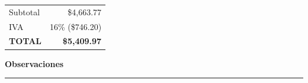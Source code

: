 \documentclass[11pt,a4paper]{article}
\begin{document}
\vspace{4mm}
\begin{flushright}
  \begin{tabular}{@{} l r @{}}
    \toprule
    Subtotal       & \$4,663.77\\
    IVA            & 16\% (\$746.20)\\
    \midrule
    \textbf{TOTAL} & \textbf{\$5,409.97}\\
    \bottomrule
  \end{tabular}
\end{flushright}

\vspace{5mm}
{\Large\textbf{Observaciones}}



\vfill
\begin{center}
  \rule{7cm}{0.4pt}\\
  
\end{center}
\end{document}
